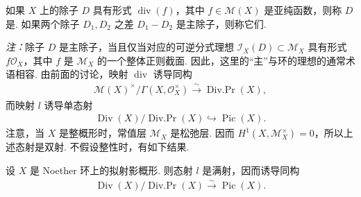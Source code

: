 \begin{definition}\label{item:ag-1-2-3}
如果 $X$ 上的除子 $D$ 具有形式 $\operatorname{div}(f)$，其中 $f\in\mathcal M(X)$ 是亚纯函数，则称 $D$ 是. 如果两个除子 $D_1,D_2$ 之差 $D_1-D_2$ 是主除子，则称它们.
\end{definition}
\emph{注：}除子 $D$ 是主除子，当且仅当对应的可逆分式理想 $\mathcal I_X(D)\subset\mathcal M_X$ 具有形式 $f\mathcal O_X$，其中 $f$ 是 $\mathcal M_X$ 的一个整体正则截面. 因此，这里的``主''与环的理想的通常术语相容.
由前面的讨论，映射 $\operatorname{div}$ 诱导同构
\begin{align*}
\mathcal M(X)^\times/\Gamma(X,\mathcal O_X^\times)\xrightarrow\sim\operatorname{Div.Pr}(X),
\end{align*}
而映射 $l$ 诱导单态射
\begin{align*}
\operatorname{Div}(X)/\operatorname{Div.Pr}(X)\hookrightarrow\operatorname{Pic}(X).
\end{align*}
注意，当 $X$ 是整概形时，常值层 $\mathcal M_X$ 是松弛层. 因而 $H^1(X,\mathcal M_X^\times)=0$，所以上述态射是双射. 不假设整性时，有如下结果.
\begin{theorem}\label{item:ag-1-2-4}
设 $X$ 是 Noether 环上的拟射影概形. 则态射 $l$ 是满射，因而诱导同构
\begin{align*}
\operatorname{Div}(X)/\operatorname{Div.Pr}(X)\xrightarrow\sim\operatorname{Pic}(X).
\end{align*}
\end{theorem}
